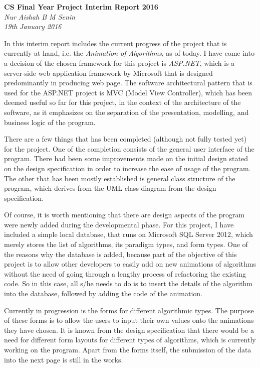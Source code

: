 \documentclass[12pt,a4paper,oneside]{report}
\begin{document}
   \begin{center}
      \Large\textbf{CS Final Year Project Interim Report 2016}\\
      \large\textit{Nur Aishah B M Senin}\\
      \large\textit{19th January 2016}
   \end{center}

In this interim report includes the current progress of the project that is currently at hand, i.e. the \textit{Animation of Algorithms}, as of today. I have come into a decision of the chosen framework for this project is \textit{ASP.NET}, which is a server-side web application framework by Microsoft that is designed predominantly in producing web page. The software architectural pattern that is used for the ASP.NET project is MVC (Model View Controller), which has been deemed useful so far for this project, in the context of the architecture of the software, as it emphasizes on the separation of the presentation, modelling, and business logic of the program.

There are a few things that has been completed (although not fully tested yet) for the project. One of the completion consists of the general user interface of the program. There had been some improvements made on the initial design stated on the design specification in order to increase the ease of usage of the program. The other that has been mostly established is general class structure of the program, which derives from the UML class diagram from the design specification. 

Of course, it is worth mentioning that there are design aspects of the program were newly added during the developmental phase. For this project, I have included a simple local database, that runs on Microsoft SQL Server 2012, which merely stores the list of algorithms, its paradigm types, and form types. One of the reasons why the database is added, because part of the objective of this project is to allow other developers to easily add on new animations of algorithms without the need of going through a lengthy process of refactoring the existing code. So in this case, all s/he needs to do is to insert the details of the algorithm into the database, followed by adding the code of the animation.

Currently in progression is the forms for different algorithmic types. The purpose of these forms is to allow the users to input their own values onto the animations they have chosen. It is known from the design specification that there would be a need for different form layouts for different types of algorithms, which is currently working on the program. Apart from the forms itself, the submission of the data into the next page is still in the works. 
\end{document}
